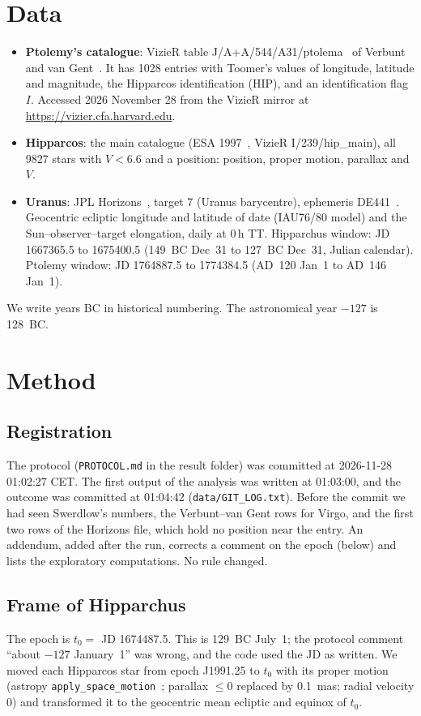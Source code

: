 \documentclass[11pt]{article}
\begin{document}
\section{Data}
\begin{itemize}
\item \textbf{Ptolemy's catalogue}: VizieR table J/A+A/544/A31/ptolema~\cite{vizierVvG} of Verbunt and van Gent~\cite{verbunt2012}. It has 1028 entries with Toomer's values of longitude, latitude and magnitude, the Hipparcos identification (HIP), and an identification flag $I$. Accessed 2026 November 28 from the VizieR mirror at \url{https://vizier.cfa.harvard.edu}.
\item \textbf{Hipparcos}: the main catalogue (ESA 1997~\cite{hipparcos}, VizieR I/239/hip\_main), all 9827 stars with $V<6.6$ and a position: position, proper motion, parallax and $V$.
\item \textbf{Uranus}: JPL Horizons~\cite{horizons}, target 7 (Uranus barycentre), ephemeris DE441~\cite{park2021}. Geocentric ecliptic longitude and latitude of date (IAU76/80 model) and the Sun--observer--target elongation, daily at 0\,h TT. Hipparchus window: JD 1667365.5 to 1675400.5 (149~BC Dec~31 to 127~BC Dec~31, Julian calendar). Ptolemy window: JD 1764887.5 to 1774384.5 (AD~120 Jan~1 to AD~146 Jan~1).
\end{itemize}
We write years BC in historical numbering. The astronomical year $-127$ is 128~BC.

\section{Method}
\subsection{Registration}
The protocol (\texttt{PROTOCOL.md} in the result folder) was committed at 2026-11-28 01:02:27 CET. The first output of the analysis was written at 01:03:00, and the outcome was committed at 01:04:42 (\texttt{data/GIT\_LOG.txt}). Before the commit we had seen Swerdlow's numbers, the Verbunt--van Gent rows for Virgo, and the first two rows of the Horizons file, which hold no position near the entry. An addendum, added after the run, corrects a comment on the epoch (below) and lists the exploratory computations. No rule changed.

\subsection{Frame of Hipparchus}
The epoch is $t_0=$ JD 1674487.5. This is 129~BC July~1; the protocol comment ``about $-127$ January~1'' was wrong, and the code used the JD as written. We moved each Hipparcos star from epoch J1991.25 to $t_0$ with its proper motion (astropy \texttt{apply\_space\_motion}~\cite{astropy2022}; parallax $\le0$ replaced by 0.1~mas; radial velocity 0) and transformed it to the geocentric mean ecliptic and equinox of $t_0$.
\end{document}
